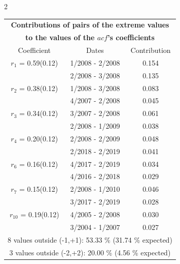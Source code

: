 
\thispagestyle{empty}
\begin{multicols}{2}{ 
\begin{tabular}{ccc}
\multicolumn{3}{c}{\textbf{Contributions of pairs of the extreme values} }  \vspace{-.10in}  \\ 
\multicolumn{3}{c}{ \textbf{to the values of the $acf$'s coefficients}} \\ 
\hline 
\hline                  Coefficient  &  Dates &  Contribution \\ 
\hline 
  $r_{ 1}$ = 0.59(0.12) &       1/2008 -  2/2008 &        0.154   \vspace{-.10in} \\  
&        2/2008 -  3/2008 &        0.135  \vspace{-.02in} \\ \hline 
  $r_{ 2}$ = 0.38(0.12) &       1/2008 -  3/2008 &        0.083   \vspace{-.10in} \\  
&        4/2007 -  2/2008 &        0.045  \vspace{-.02in} \\ \hline 
  $r_{ 3}$ = 0.34(0.12) &       3/2007 -  2/2008 &        0.061   \vspace{-.10in} \\  
&        2/2008 -  1/2009 &        0.038  \vspace{-.02in} \\ \hline 
  $r_{ 4}$ = 0.20(0.12) &       2/2008 -  2/2009 &        0.048   \vspace{-.10in} \\  
&        2/2018 -  2/2019 &        0.041  \vspace{-.02in} \\ \hline 
  $r_{ 6}$ = 0.16(0.12) &       4/2017 -  2/2019 &        0.034   \vspace{-.10in} \\  
&        4/2016 -  2/2018 &        0.029  \vspace{-.02in} \\ \hline 
  $r_{ 7}$ = 0.15(0.12) &       2/2008 -  1/2010 &        0.046   \vspace{-.10in} \\  
&        3/2017 -  2/2019 &        0.028  \vspace{-.02in} \\ \hline 
  $r_{10}$ = 0.19(0.12) &       4/2005 -  2/2008 &        0.030   \vspace{-.10in} \\  
&        3/2004 -  1/2007 &        0.027  \vspace{-.02in} \\ \hline 
\multicolumn{3}{c}{               8 values outside (-1,+1): 53.33  \% (31.74  \% expected)}\vspace{-.10in} \\ 
\multicolumn{3}{c}{               3 values outside (-2,+2): 20.00 \%  (4.56 \% expected) } \\
 \end{tabular} \\ 
 } 
\end{multicols} 
